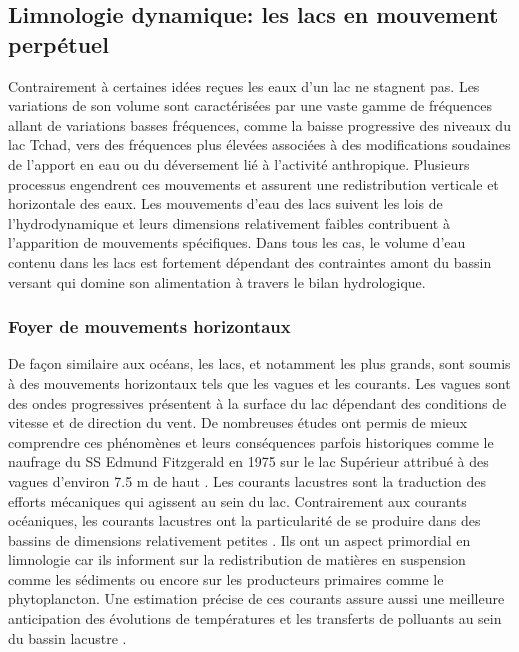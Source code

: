 \subsection{{\selectfont Limnologie dynamique: les lacs en mouvement perpétuel}}
\label{sec:limno_dyn}

Contrairement à certaines idées reçues les eaux d'un lac ne stagnent pas. Les variations de son volume sont caractérisées par une vaste gamme de fréquences allant de variations basses fréquences, comme la baisse progressive des niveaux du lac Tchad, vers des fréquences plus élevées associées à des modifications soudaines de l'apport en eau ou du déversement lié à l'activité anthropique. Plusieurs processus engendrent ces mouvements et assurent une redistribution verticale et horizontale des eaux. Les mouvements d'eau des lacs suivent les lois de l'hydrodynamique et leurs dimensions relativement faibles contribuent à l'apparition de mouvements spécifiques. Dans tous les cas, le volume d'eau contenu dans les lacs est fortement dépendant des contraintes amont du bassin versant qui domine son alimentation à travers le bilan hydrologique.

\subsubsection{{\selectfont Foyer de mouvements horizontaux}}

De façon similaire aux océans, les lacs, et notamment les plus grands, sont soumis à des mouvements horizontaux tels que les vagues et les courants. Les vagues sont des ondes progressives présentent à la surface du lac dépendant des conditions de vitesse et de direction du vent. De nombreuses études \citep{mccombs2014,ji2017,grieco2019} ont permis de mieux comprendre ces phénomènes et leurs conséquences parfois historiques comme le naufrage du SS Edmund Fitzgerald en 1975 sur le lac Supérieur attribué à des vagues d'environ 7.5 m de haut \citep{hultquist2006}. Les courants lacustres sont la traduction des efforts mécaniques qui agissent au sein du lac. Contrairement aux courants océaniques, les courants lacustres ont la particularité de se produire dans des bassins de dimensions relativement petites \citep{beletsky1999,laval2003,amadori2018}. Ils ont un aspect primordial en limnologie car ils informent sur la redistribution de matières en suspension comme les sédiments ou encore sur les producteurs primaires comme le phytoplancton. Une estimation précise de ces courants assure aussi une meilleure anticipation des évolutions de températures et les transferts de polluants au sein du bassin lacustre \citep{baracchini2020}.

